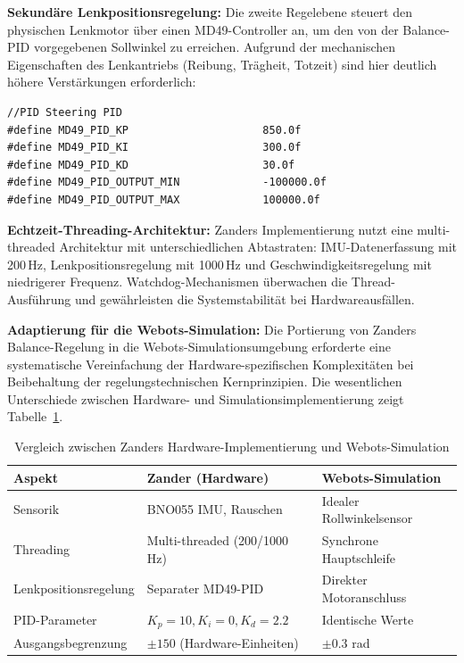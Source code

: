 \textbf{Sekundäre Lenkpositionsregelung:} Die zweite Regelebene steuert den physischen Lenkmotor über einen MD49-Controller an, 
um den von der Balance-PID vorgegebenen Sollwinkel zu erreichen. Aufgrund der mechanischen Eigenschaften des Lenkantriebs 
(Reibung, Trägheit, Totzeit) sind hier deutlich höhere Verstärkungen erforderlich:

\begin{lstlisting}[style=wbt_c,caption={Lenkpositions-PID-Parameter in Zanders System},label={lst:zander_steering_pid}]
//PID Steering PID
#define MD49_PID_KP                     850.0f
#define MD49_PID_KI                     300.0f
#define MD49_PID_KD                     30.0f
#define MD49_PID_OUTPUT_MIN             -100000.0f
#define MD49_PID_OUTPUT_MAX             100000.0f
\end{lstlisting}

\textbf{Echtzeit-Threading-Architektur:} Zanders Implementierung nutzt eine multi-threaded Architektur mit unterschiedlichen 
Abtastraten: IMU-Datenerfassung mit 200\,Hz, Lenkpositionsregelung mit 1000\,Hz und Geschwindigkeitsregelung mit niedrigerer 
Frequenz. Watchdog-Mechanismen überwachen die Thread-Ausführung und gewährleisten die Systemstabilität bei Hardwareausfällen.

\textbf{Adaptierung für die Webots-Simulation:} Die Portierung von Zanders Balance-Regelung in die Webots-Simulationsumgebung 
erforderte eine systematische Vereinfachung der Hardware-spezifischen Komplexitäten bei Beibehaltung der regelungstechnischen 
Kernprinzipien. Die wesentlichen Unterschiede zwischen Hardware- und Simulationsimplementierung zeigt Tabelle~\ref{tab:zander_comparison}.

\begin{table}[H]
\centering
\caption{Vergleich zwischen Zanders Hardware-Implementierung und Webots-Simulation}
\label{tab:zander_comparison}
\begin{tabular}{|l|l|l|}
\hline
\textbf{Aspekt} & \textbf{Zander (Hardware)} & \textbf{Webots-Simulation} \\
\hline
Sensorik & BNO055 IMU, Rauschen & Idealer Rollwinkelsensor \\
Threading & Multi-threaded (200/1000 Hz) & Synchrone Hauptschleife \\
Lenkpositionsregelung & Separater MD49-PID & Direkter Motoranschluss \\
PID-Parameter & $K_p=10, K_i=0, K_d=2.2$ & Identische Werte \\
Ausgangsbegrenzung & $\pm 150$ (Hardware-Einheiten) & $\pm 0.3$ rad \\
\hline
\end{tabular}
\end{table}

